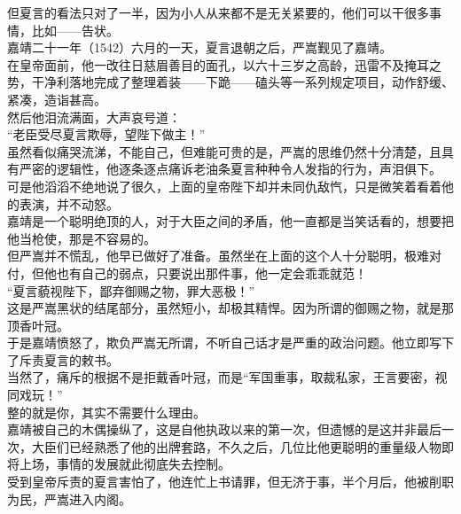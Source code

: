 \begin{multicols}{\theparacolNo}
但夏言的看法只对了一半，因为小人从来都不是无关紧要的，他们可以干很多事情，比如——告状。\\

嘉靖二十一年（1542）六月的一天，夏言退朝之后，严嵩觐见了嘉靖。\\

在皇帝面前，他一改往日慈眉善目的面孔，以六十三岁之高龄，迅雷不及掩耳之势，干净利落地完成了整理着装——下跪——磕头等一系列规定项目，动作舒缓、紧凑，造诣甚高。\\

然后他泪流满面，大声哀号道：\\

“老臣受尽夏言欺辱，望陛下做主！”\\

虽然看似痛哭流涕，不能自己，但难能可贵的是，严嵩的思维仍然十分清楚，且具有严密的逻辑性，他逐条逐点痛诉老油条夏言种种令人发指的行为，声泪俱下。\\

可是他滔滔不绝地说了很久，上面的皇帝陛下却并未同仇敌忾，只是微笑着看着他的表演，并不动怒。\\

嘉靖是一个聪明绝顶的人，对于大臣之间的矛盾，他一直都是当笑话看的，想要把他当枪使，那是不容易的。\\

但严嵩并不慌乱，他早已做好了准备。虽然坐在上面的这个人十分聪明，极难对付，但他也有自己的弱点，只要说出那件事，他一定会乖乖就范！\\

“夏言藐视陛下，鄙弃御赐之物，罪大恶极！”\\

这是严嵩黑状的结尾部分，虽然短小，却极其精悍。因为所谓的御赐之物，就是那顶香叶冠。\\

于是嘉靖愤怒了，欺负严嵩无所谓，不听自己话才是严重的政治问题。他立即写下了斥责夏言的敕书。\\

当然了，痛斥的根据不是拒戴香叶冠，而是“军国重事，取裁私家，王言要密，视同戏玩！”\\

整的就是你，其实不需要什么理由。\\

嘉靖被自己的木偶操纵了，这是自他执政以来的第一次，但遗憾的是这并非最后一次，大臣们已经熟悉了他的出牌套路，不久之后，几位比他更聪明的重量级人物即将上场，事情的发展就此彻底失去控制。\\

受到皇帝斥责的夏言害怕了，他连忙上书请罪，但无济于事，半个月后，他被削职为民，严嵩进入内阁。\\


\end{multicols}

